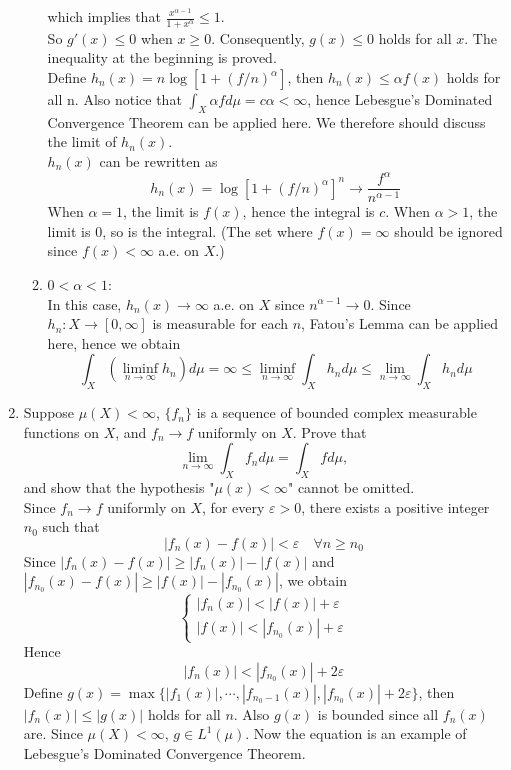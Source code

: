 \documentclass{article}
\begin{document}
\begin{enumerate}
\begin{enumerate}
 			which implies that $\frac{x^{\alpha-1}}{1+x^{\alpha}}\leq1$.\\
 			So $g'(x)\leq{0}$ when $x\geq0$. Consequently, $g(x)\leq{0}$ holds for all $x$. The inequality at the beginning is proved.\\
 			Define $h_n(x)=n\log[1+(f/n)^{\alpha}]$, then $h_n(x)\leq \alpha{f(x)}$ holds for all n. Also notice that $\int_{X}\alpha{f}d\mu=c\alpha<\infty$, hence Lebesgue's Dominated Convergence Theorem can be applied here. We therefore should discuss the limit of $h_n(x)$.\\
 			$h_n(x)$ can be rewritten as
 			\[
 				h_n(x)=\log[1+(f/n)^{\alpha}]^n\to\frac{f^{\alpha}}{n^{\alpha-1}}
 			\]
 			When $\alpha=1$, the limit is $f(x)$, hence the integral is $c$. When $\alpha>1$, the limit is $0$, so is the integral. (The set where $f(x)=\infty$ should be ignored since $f(x)<\infty$ a.e. on $X$.)\\
 		\item $0<\alpha<1$:\\
 			In this case, $h_n(x)\to\infty$ a.e. on $X$ since $n^{\alpha-1}\to{0}$. Since $h_n:X\to[0,\infty]$ is measurable for each $n$, Fatou's Lemma can be applied here, hence we obtain
 			\[
 				\int_{X}\left(\liminf_{n\to\infty}h_n\right)d\mu=\infty\leq\liminf_{n\to\infty}\int_{X}h_nd\mu\leq\lim_{n\to\infty}\int_{X}h_nd\mu
 			\]
 	\end{enumerate}
 	\item \exercise Suppose $\mu(X)<\infty$, $\{f_n\}$ is a sequence of bounded complex measurable functions on $X$, and $f_n\to f$ uniformly on $X$. Prove that
 	\[
 		\lim_{n\to\infty}\int_{X}f_nd\mu=\int_{X}fd\mu,
 	\]
 	and show that the hypothesis "$\mu(x)<\infty$" cannot be omitted.\\
 	\solution
 	Since $f_n\to f$ uniformly on $X$, for every $\varepsilon>0$, there exists a positive integer $n_0$ such that
 	\[
 		|f_n(x)-f(x)|<\varepsilon\quad\forall{n\geq n_0}
 	\]
 	Since $|f_n(x)-f(x)|\geq|f_{n}(x)|-|f(x)|$ and $|f_{n_0}(x)-f(x)|\geq|f(x)|-|f_{n_0}(x)|$, we obtain
 	\[
 		\begin{cases}
 		|f_{n}(x)|<|f(x)|+\varepsilon\\
 		|f(x)|<|f_{n_0}(x)|+\varepsilon
 		\end{cases}
 	\]
 	Hence
 	\[
 		|f_n(x)|<|f_{n_0}(x)|+2\varepsilon
 	\]
 	Define $g(x)=\max\{|f_1(x)|,\cdots,|f_{n_0-1}(x)|,|f_{n_0}(x)|+2\varepsilon\}$, then $|f_n(x)|\leq|g(x)|$ holds for all $n$. Also $g(x)$ is bounded since all $f_n(x)$ are. Since $\mu(X)<\infty$, $g\in{L^1(\mu)}$. Now the equation is an example of Lebesgue's Dominated Convergence Theorem.\\

\end{enumerate}
\end{document}
